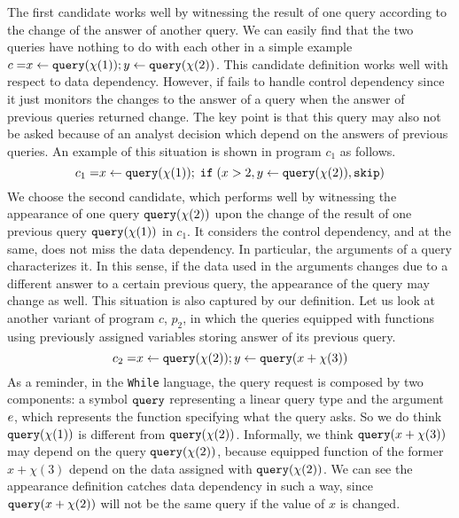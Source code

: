 \documentclass[a4paper,11pt]{article}
\begin{document}
{
   The first candidate works well by witnessing the result of one query according to the change of the answer of another query. We can easily find that the two queries have nothing to do with each other in a simple example   
%
    $ c = \mathrel{ x \leftarrow {\tt query}(\chi(1)) } ; \mathrel{ y \leftarrow {\tt query}(\chi(2)) }$. This candidate definition works well with respect to data dependency. 
    However, if fails to handle control dependency since it just monitors the changes to the answer of a query when the answer of previous queries returned change. 
    The key point is that this query may also not be asked because of an analyst decision which depend on the answers of previous queries. 
    An example of this situation is shown in program $c_1$ as follows.
    \[
      c_1 = \mathrel{ x \leftarrow {\tt query}(\chi(1)) } ; \;\mathtt{if}\;( x > 2 ,\mathrel{ y \leftarrow {\tt query}(\chi(2)) }, \mathtt{skip} )
   	\]
   	We choose the second candidate, which performs well by witnessing the appearance of one query ${\tt query}(\chi(2))$ upon the change of the result of one previous query ${\tt query}(\chi(1))$ in $c_1$. 
   	It considers the control dependency, and at the same, does not miss the data dependency.
   	In particular, the arguments of a query characterizes it.
   	In this sense, if the data used in the arguments changes due to a different answer to a certain previous query, the appearance of the query may change as well.
   	This situation is also captured by our definition. 
   	Let us look at another variant of program $c$, $p_2$, in which the queries equipped with functions using previously assigned variables storing answer of its previous query.
    \[
      c_2 = \mathrel{ x \leftarrow {\tt query}(\chi(2)) } ; \mathrel{ y \leftarrow {\tt query}(x+\chi(3)) }
   	\]
    As a reminder, in the {\tt While} language, the query request is composed by two components: a symbol ${\tt query}$ representing a linear query type and the argument $e$, which represents the function specifying what the query asks. 
    So we do think ${\tt query}(\chi(1))$ is different from ${\tt query}(\chi(2))$.
    Informally, we think ${\tt query}(x+\chi(3))$ may depend on the query ${\tt query}(\chi(2))$, because equipped function of the former $x+\chi(3)$ depend on the data assigned with ${\tt query}(\chi(2))$.
    We can see the appearance definition catches data dependency in such a way, 
    since ${\tt query}(x+\chi(2))$ will not be the same query if the value of $x$ is changed.    
}
\end{document}
